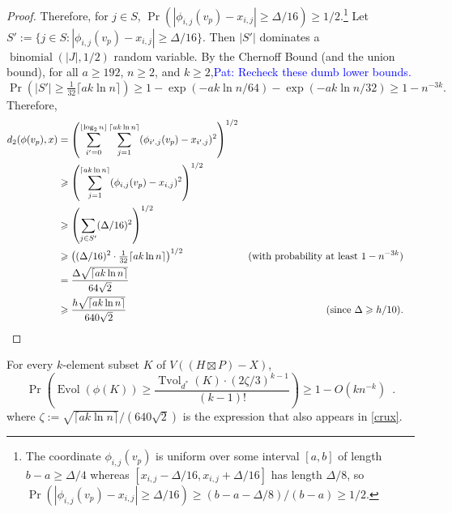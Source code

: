 \documentclass{patmorin}
\renewcommand{\ge}{\geqslant}
\newcommand{\pat}[1]{\textcolor{Blue}{Pat: #1}}
\DeclareMathOperator{\evol}{Evol}
\DeclareMathOperator{\tvol}{Tvol}
\begin{document}
\begin{proof}
  Therefore, for $j\in S$, $\Pr(|\phi_{i,j}(v_p)-x_{i,j}|\ge \Delta/16)\ge 1/2$.\footnote{The coordinate $\phi_{i,j}(v_p)$ is uniform over some interval $[a,b]$ of length $b-a\ge \Delta/4$ whereas $[x_{i,j}-\Delta/16,x_{i,j}+\Delta/16]$ has length $\Delta/8$, so $\Pr(|\phi_{i,j}(v_p)-x_{i,j}|\ge \Delta/16)\ge (b-a-\Delta/8)/(b-a)\ge 1/2$.}
  Let $S':=\{j\in S:  |\phi_{i,j}(v_p)-x_{i,j}|\ge \Delta/16\}$.  Then $|S'|$ dominates a $\operatorname{binomial}(|J|,1/2)$ random variable.  By the Chernoff Bound (and the union bound), for all $a\ge 192$, $n\ge 2$, and $k\ge 2$,\pat{Recheck these dumb lower bounds.}
  \[
    \Pr(|S'|\ge \tfrac{1}{32}\lceil a k\ln n\rceil)\ge 1-\exp(-ak\ln n/64)-\exp(-ak\ln n/32)\ge 1-n^{-3k}.
  \]
  Therefore,
  \begin{align*}
    d_2(\phi(v_p),x)
    & = \left(\sum_{i'=0}^{\lfloor\log_2 n\rfloor}\sum_{j=1}^{\lceil ak\ln  n\rceil}(\phi_{i',j}(v_p)-x_{i',j})^2\right)^{1/2} \\
    & \ge \left(\sum_{j=1}^{\lceil ak\ln  n\rceil}(\phi_{i,j}(v_p)-x_{i,j})^2\right)^{1/2} \\
    & \ge \left(\sum_{j\in S'}(\Delta/16)^2\right)^{1/2} \\
    & \ge \left((\Delta/16)^2\cdot \tfrac{1}{32}\lceil ak\ln  n\rceil\right)^{1/2}
      & \text{(with probability at least $1-n^{-3k}$)} \\
    & = \frac{\Delta\sqrt{\lceil ak\ln n\rceil}}{64\sqrt{2}} \\
    & \ge \frac{h\sqrt{\lceil ak\ln n\rceil}}{640\sqrt{2}}
     & \text{(since $\Delta\ge h/10$)}. &
    \qedhere
  \end{align*}
\end{proof}

\begin{clm}\label{volume_preserver}
  For every $k$-element subset $K$ of $V((H\boxtimes P)-X)$,
  \[
    \Pr\left(\evol(\phi(K)) \ge \frac{\tvol_{d^*}(K)\cdot(2\zeta/3)^{k-1}}{(k-1)!}\right) \ge 1- O(kn^{-k}) \enspace .
  \]
  where $\zeta:=\sqrt{\lceil ak\ln n\rceil}/(640\sqrt{2})$ is the expression that also appears in \cref{crux}.
\end{clm}
\end{document}
